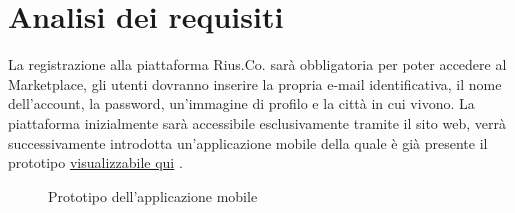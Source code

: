 \section{Analisi dei requisiti}
La registrazione alla piattaforma Rius.Co. sarà obbligatoria per poter accedere al Marketplace, gli utenti dovranno inserire la propria e-mail identificativa, il nome dell'account, la password, un'immagine di profilo e la città in cui vivono. La piattaforma inizialmente sarà accessibile esclusivamente tramite il sito web, verrà successivamente introdotta un'applicazione mobile della quale è già presente il prototipo \href{https://mauro886267.invisionapp.com/console/share/7Z10U19EHJ/476334736}{visualizzabile qui} \cite{Prototipo}.  
\medskip

\begin{figure}[hb]
    \hfill
    \hfill
    \hfill
    \hfill
    \caption{Prototipo dell'applicazione mobile}
\end{figure}


